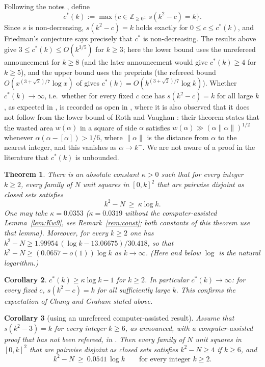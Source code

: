 \documentclass[11pt]{amsart}
\newtheorem{theorem}{Theorem}[section]
\newtheorem{corollary}[theorem]{Corollary}
\theoremstyle{definition}
\theoremstyle{remark}
\newcommand{\Z}{\mathbb{Z}}
\begin{document}
Following the notes \cite[file \texttt{s12/search/FRIEDMAN.md}]{Dan}, define
\[
c^*(k):=\max\{c\in\Z_{\ge0}:\ s(k^2-c)=k\}.
\]
Since $s$ is non-decreasing, $s(k^2-c)=k$ holds exactly for $0\le c\le c^*(k)$, and Friedman's conjecture says
precisely that $c^*$ is non-decreasing. The results above give $3\le c^*(k)\le O(k^{3/5})$ for $k\ge3$; here the lower
bound uses the unrefereed announcement \cite{Dan} for $k\ge 8$ (and the later announcement would give $c^*(k)\ge4$ for $k\ge5$), and the upper bound uses the preprints \cite{McC,Bui}
(the refereed bound $O(x^{(3+\sqrt2)/7}\log x)$ of \cite{CG09} gives $c^*(k)=O(k^{(3+\sqrt2)/7}\log k)$).
Whether $c^*(k)\to\infty$, i.e.\ whether for every fixed $c$ one has $s(k^2-c)=k$ for
all large $k$, as expected in \cite{CG09}, is recorded as open in \cite{Dan}, where it is also observed that it does not follow from the lower bound
of Roth and Vaughan \cite{RV}: their theorem \cite[p.~170, Theorem]{RV} states that the wasted area $w(\alpha)$ in a square of side $\alpha$
satisfies $w(\alpha)\gg(\alpha\|\alpha\|)^{1/2}$ whenever $\alpha(\alpha-[\alpha])>1/6$, where $\|\alpha\|$ is the
distance from $\alpha$ to the nearest integer, and this vanishes as $\alpha\to k^-$. We are not aware of a proof in the
literature that $c^*(k)$ is unbounded.

\begin{theorem}\label{thm:main}
There is an absolute constant $\kappa>0$ such that for every integer $k\ge 2$, every family of $N$ unit
squares in $[0,k]^2$ that are pairwise disjoint as closed sets satisfies
\[
k^2-N\ \ge\ \kappa\log k .
\]
One may take $\kappa=0.0353$ ($\kappa=0.0319$ without the computer-assisted Lemma~\ref{lem:Kw9}, see Remark~\ref{rem:const};
both constants of this theorem use that lemma). Moreover, for every $k\ge2$ one has
$k^2-N\ge1.99954\,(\log k-13.06675)/30.418$, so that $k^2-N\ge(0.0657-o(1))\log k$ as $k\to\infty$. (Here and below $\log$ is the
natural logarithm.)
\end{theorem}

\begin{corollary}\label{cor:main}
$c^*(k)\ge \kappa\log k-1$ for $k\ge 2$. In particular $c^*(k)\to\infty$: for every fixed $c$,
$s(k^2-c)=k$ for all sufficiently large $k$. This confirms the expectation of Chung and Graham \cite{CG09} stated above.
\end{corollary}

\begin{corollary}[using an unrefereed computer-assisted result]\label{cor:evand}
Assume that $s(k^2-3)=k$ for every integer $k\ge6$, as announced, with a computer-assisted proof that has not been
refereed, in \cite[directory \texttt{s12/certificates/k2m3}]{Dan}. Then every family of $N$ unit squares in $[0,k]^2$ that are
pairwise disjoint as closed sets satisfies $k^2-N\ge4$ if $k\ge6$, and
\[
k^2-N\ \ge\ 0.0541\,\log k\qquad\text{for every integer }k\ge2 .
\]
\end{corollary}
\end{document}
